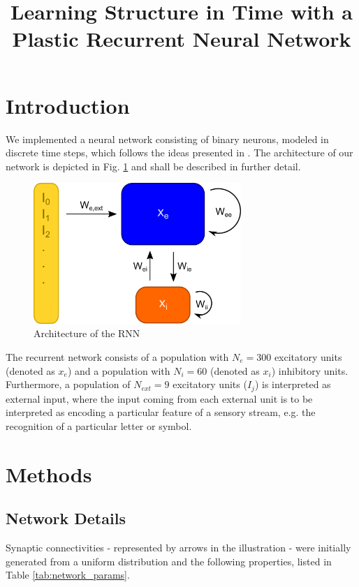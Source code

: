 \documentclass[10pt,a4paper]{article}
\title{Learning Structure in Time with a Plastic Recurrent Neural Network}
\begin{document}
\maketitle
\section{Introduction}

We implemented a neural network consisting of binary neurons, modeled in discrete time steps, which follows the ideas presented in \cite{Duarte_2014}. The architecture of our network is depicted in Fig. \ref{fig:architecture} and shall be described in further detail.

\begin{figure}
\includegraphics[width=0.7\textwidth]{../plots/illustration.png}
\caption{\label{fig:architecture} Architecture of the RNN}
\end{figure}

The recurrent network consists of a population with $N_e = 300$ excitatory units (denoted as $x_e$) and a population with $N_i = 60$ (denoted as $x_i$) inhibitory units. Furthermore, a population of $N_{ext} = 9$ excitatory units ($I_j$) is interpreted as external input, where the input coming from each external unit is to be interpreted as encoding a particular feature of a sensory stream, e.g. the recognition of a particular letter or symbol.

\section{Methods}
\subsection{Network Details}

Synaptic connectivities - represented by arrows in the illustration - were initially generated from a uniform distribution and the following properties, listed in Table \ref{tab:network_params}.
\end{document}

